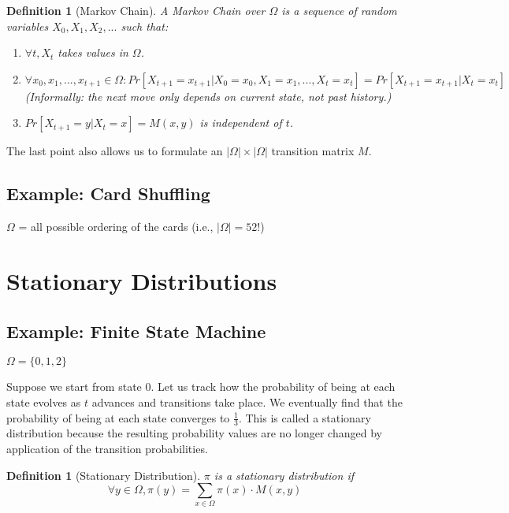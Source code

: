 \documentclass[twoside]{article}
\newtheorem{definition}[theorem]{Definition}
\begin{document}
\begin{definition}[Markov Chain]
   A Markov Chain over $\Omega$ is a sequence of random variables $X_0, X_1, X_2, ...$ such that:
   \begin{enumerate}
      \item $\forall t, X_t$ takes values in $\Omega$.
      \item $\forall x_0, x_1, ..., x_{t+1} \in \Omega: Pr[X_{t+1} = x_{t+1}|X_0 = x_0, X_1 = x_1, ..., X_t = x_t] = Pr[X_{t+1} = x_{t+1}|X_t = x_t]$ \\
      (Informally: the next move only depends on current state, not past history.)
      \item $Pr[X_{t+1} = y|X_t = x] = M(x, y)$ is independent of $t$.
   \end{enumerate}
\end{definition}

The last point also allows us to formulate an $|\Omega| \times |\Omega|$ transition matrix $M$.

\subsection{Example: Card Shuffling}

$\Omega$ = all possible ordering of the cards (i.e., $|\Omega| = 52!$)


\section{Stationary Distributions}

\subsection{Example: Finite State Machine}

$\Omega = \{0, 1, 2\}$

Suppose we start from state 0. Let us track how the probability of being at each state evolves as $t$ advances and transitions take place. We eventually find that the probability of being at each state converges to $\frac{1}{3}$. This is called a stationary distribution because the resulting probability values are no longer changed by application of the transition probabilities.

\begin{definition}[Stationary Distribution]
   $\pi$ is a stationary distribution if
   $$
   \forall y \in \Omega, \pi(y) = \sum_{x \in \Omega} \pi(x) \cdot M(x, y)
   $$
\end{definition}
\end{document}

